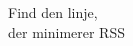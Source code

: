 \documentclass[preview]{standalone}
\begin{document}
\begin{center}
Find den linje, \\ der minimerer RSS
\end{center}
\end{document}
